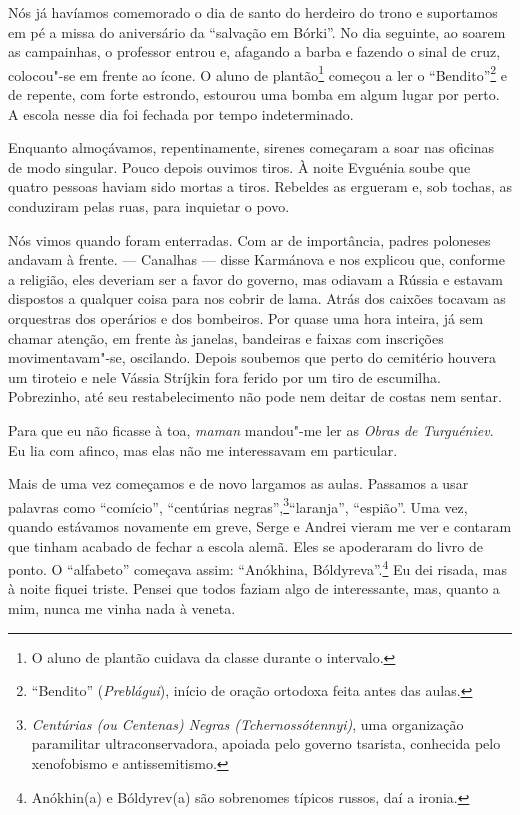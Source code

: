 Nós já havíamos comemorado o dia de santo do herdeiro do trono e
suportamos em pé a missa do aniversário da ``salvação em Bórki''. No dia
seguinte, ao soarem as campainhas, o professor entrou e, afagando a
barba e fazendo o sinal de cruz, colocou"-se em frente ao ícone. O aluno
de plantão\footnote{O aluno de plantão cuidava da classe durante o
  intervalo.} começou a ler o ``Bendito''\footnote{``Bendito''
  (\emph{Preblágui}), início de oração ortodoxa feita antes das aulas.}
e de repente, com forte estrondo, estourou uma bomba em algum lugar por
perto. A escola nesse dia foi fechada por tempo indeterminado.

Enquanto almoçávamos, repentinamente, sirenes começaram a soar nas
oficinas de modo singular. Pouco depois ouvimos tiros. À noite Evguénia
soube que quatro pessoas haviam sido mortas a tiros. Rebeldes as
ergueram e, sob tochas, as conduziram pelas ruas, para inquietar o povo.

Nós vimos quando foram enterradas. Com ar de importância, padres
poloneses andavam à frente. --- Canalhas --- disse Karmánova e nos
explicou que, conforme a religião, eles deveriam ser a favor do governo,
mas odiavam a Rússia e estavam dispostos a qualquer coisa para nos
cobrir de lama. Atrás dos caixões tocavam as orquestras dos operários e
dos bombeiros. Por quase uma hora inteira, já sem chamar atenção, em
frente às janelas, bandeiras e faixas com inscrições movimentavam"-se,
oscilando. Depois soubemos que perto do cemitério houvera um tiroteio e
nele Vássia Stríjkin fora ferido por um tiro de escumilha. Pobrezinho,
até seu restabelecimento não pode nem deitar de costas nem sentar.

Para que eu não ficasse à toa, \emph{maman} mandou"-me ler as \emph{Obras
de Turguéniev}. Eu lia com afinco, mas elas não me interessavam em
particular.

Mais de uma vez começamos e de novo largamos as aulas. Passamos a usar
palavras como ``comício'', ``centúrias negras'',\footnote{\emph{Centúrias
  (ou Centenas) Negras (Tchernossótennyi)}, uma organização paramilitar
  ultraconservadora, apoiada pelo governo tsarista, conhecida pelo
  xenofobismo e antissemitismo.}``laranja'', ``espião''. Uma vez, quando
estávamos novamente em greve, Serge e Andrei vieram me ver e contaram
que tinham acabado de fechar a escola alemã. Eles se apoderaram do livro
de ponto. O ``alfabeto'' começava assim: ``Anókhina,
Bóldyreva''.\footnote{Anókhin(a) e Bóldyrev(a) são sobrenomes típicos
  russos, daí a ironia.} Eu dei risada, mas à noite fiquei triste.
Pensei que todos faziam algo de interessante, mas, quanto a mim, nunca
me vinha nada à veneta.

